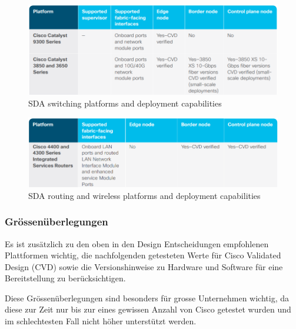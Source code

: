 \begin{figure}[H]
	\centering
	\includegraphics[width=1\linewidth]{img/Analyse/SDAswitchingplatformsanddeploymentcapabilities}
	\caption{SDA switching platforms and deployment capabilities \cite{sda-designguide}}
	\label{fig:SDA switching platforms and deployment capabilities}
\end{figure}

\begin{figure}[H]
	\centering
	\includegraphics[width=1\linewidth]{img/Analyse/SDAroutingandwirelessplatformsanddeploymentcapabilities}
	\caption{SDA routing and wireless platforms and deployment capabilities \cite{sda-designguide}}
	\label{fig:SDA routing and wireless platforms and deployment capabilities}
\end{figure}

\subsubsection{Grössenüberlegungen}
Es ist zusätzlich zu den oben in den Design Entscheidungen empfohlenen Plattformen wichtig, die nachfolgenden getesteten Werte für Cisco Validated Design (CVD) sowie die Versionshinweise zu Hardware und Software für eine Bereitstellung zu berücksichtigen.

Diese Grössenüberlegungen sind besonders für grosse Unternehmen wichtig, da diese zur Zeit nur bis zur eines gewissen Anzahl von Cisco getestet wurden und im schlechtesten Fall nicht höher unterstützt werden.


